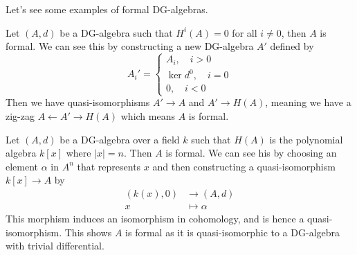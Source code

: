 Let's see some examples of formal DG-algebras. 

\begin{example}
Let $(A, d)$ be a DG-algebra such that $H^i(A) = 0$ for all $i\neq 0$, then $A$ is formal. We can see this by constructing a new DG-algebra $A'$ defined by
\begin{equation*}
A_i'=
\begin{cases}
    A_i, \quad i > 0 \\
    \ker d^0, \quad i=0 \\
    0, \quad i < 0
\end{cases}    
\end{equation*}
Then we have quasi-isomorphisms $A'\longrightarrow A$ and $A'\longrightarrow H(A)$, meaning we have a zig-zag $A\longleftarrow A' \longrightarrow H(A)$ which means $A$ is formal. 
\end{example}

\begin{example}
Let $(A, d)$ be a DG-algebra over a field $k$ such that $H(A)$ is the polynomial algebra $k[x]$ where $|x|=n$. Then $A$ is formal. We can see his by choosing an element $\alpha$ in $A^n$ that represents $x$ and then constructing a quasi-isomorphism $k[x]\longrightarrow A$ by
\begin{align*}
    (k(x), 0)&\longrightarrow (A,d) \\
    x &\longmapsto \alpha
\end{align*} 
This morphism induces an isomorphism in cohomology, and is hence a quasi-isomorphism. This shows $A$ is formal as it is quasi-isomorphic to a DG-algebra with trivial differential. 
\end{example}














